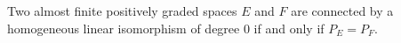 Two almost finite positively graded spaces $E$ and $F$ are connected by a homogeneous linear isomorphism of degree $0$ if and only if $P_E = P_F$.
